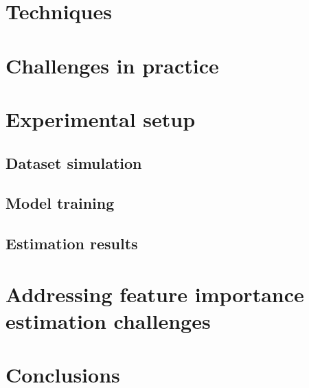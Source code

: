 \section{Techniques}
\label{sec:feature_importance_estimation_techniques}


\section{Challenges in practice}
\label{sec:feature_importance_estimation_challenges}


\section{Experimental setup}
\label{sec:experimental_setup}


\subsection{Dataset simulation}
\label{sec:dataset_simulation}


\subsection{Model training}
\label{sec:model_training_evaluation}


\subsection{Estimation results}
\label{sec:estimation_results}



\section{Addressing feature importance estimation challenges}
\label{sec:addressing_feature_importance_estimation_challenges}



\section{Conclusions}
\label{sec:feature_importance_estimation_conclusions}



